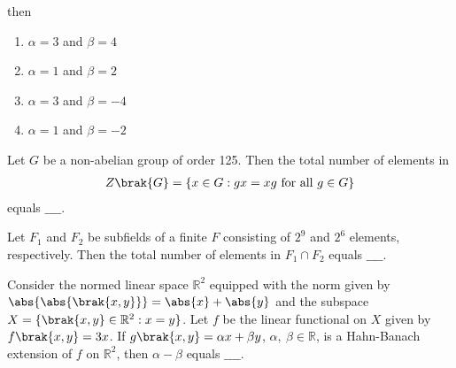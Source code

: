  then
  \begin{enumerate}
   \item $\alpha = 3$ and $\beta = 4$
   \item $\alpha = 1$ and $\beta = 2$
   \item $\alpha = 3$ and $\beta = -4$
   \item $\alpha = 1$ and $\beta = -2$ \\
\end{enumerate}
\item Let $G$ be a non-abelian group of order 125. Then the total number of elements in 
\begin{align*}
    Z\brak{G} = \{x \in G : gx = xg \text{ for all } g \in G\}
\end{align*}
equals $\_\_\_\_$. \\
\item Let $F_1$ and $F_2$ be subfields of a finite $F$ consisting of $2^9$ and $2^6$ elements, respectively. Then the total number of elements in $F_1 \cap F_2$ equals $\_\_\_\_$. \\
\item Consider the normed linear space $\mathbb{R}^2$ equipped with the norm given by $\abs{\abs{\brak{x, y}}} = \abs{x} + \abs{y}$ and the subspace $X = \{\brak{x, y} \in \mathbb{R}^2 : x = y \}$. Let $f$ be the linear functional on $X$ given by $f\brak{x, y} = 3x$. If $g\brak{x, y} = \alpha x + \beta y$, $\alpha,\ \beta \in \mathbb{R}$, is a Hahn-Banach extension of $f$ on $\mathbb{R}^2$, then $\alpha - \beta$ equals $\_\_\_\_$. \\
